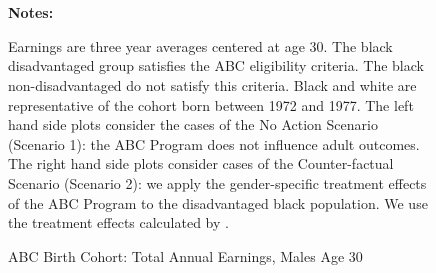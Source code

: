 \begin{figure} \begin{center}\centering
        \caption{ABC Birth Cohort: Total Annual Earnings, Males Age 30}
        \label{male_earn_decile_abc}\vspace{0.2cm}        
          \\
          \\
\end{center}
{\scriptsize {\bfseries Notes: } \raggedright Earnings are three year averages centered at age 30. The black disadvantaged group satisfies the ABC eligibility criteria. The black non-disadvantaged do not satisfy this criteria. Black and white are representative of the cohort born between 1972 and 1977. The left hand side plots consider the cases of the No Action Scenario (Scenario 1): the ABC Program does not influence adult outcomes. The right hand side plots consider cases of the Counter-factual Scenario (Scenario 2): we apply the gender-specific treatment effects of the ABC Program to the disadvantaged black population. We use the treatment effects calculated by \citet{Frances_2013_EJ}. 
}
\end{figure}


